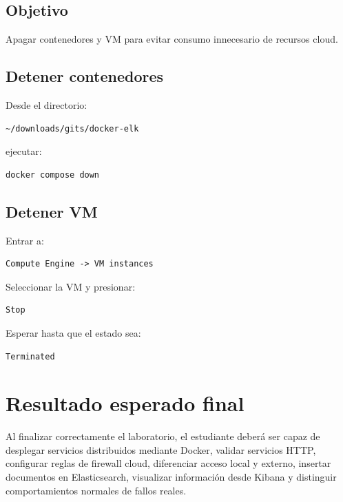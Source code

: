 \documentclass[
  coursetitle={Cómputo Nube y Tecnologías Emergentes},
  coursehours={96},
  coursedate={Verano 2026},
  doctype={Práctica},
  otherlangs={english,french},
  authorname={Lázaro},
  authorsurname={Bustio-Martínez},
  authortitle={PhD},
  role={Profesor Investigador},
  email={lbustio@inaoe.mx},
  phone={5559504000},
  ext={7459},
  institution={Instituto Nacional de Astrofísica, Óptica y Electrónica (INAOE)},
  department={Maestría en Ciencias en Tecnologías de Seguridad},
  address={Luis Enrique Erro 1, Sta. Ma. Tonantzintla, San Andrés Cholula, CP 72840, Puebla, México},
  margin={0.5in}
]{../../lbustio_lecture_notes}
\begin{document}
\subsection{Objetivo}

Apagar contenedores y VM para evitar consumo innecesario de recursos cloud.

\subsection{Detener contenedores}

Desde el directorio:

\begin{verbatim}
~/downloads/gits/docker-elk
\end{verbatim}

ejecutar:

\begin{lstlisting}
docker compose down
\end{lstlisting}

\subsection{Detener VM}

Entrar a:

\begin{verbatim}
Compute Engine -> VM instances
\end{verbatim}

Seleccionar la VM y presionar:

\begin{verbatim}
Stop
\end{verbatim}

Esperar hasta que el estado sea:

\begin{verbatim}
Terminated
\end{verbatim}

\section{Resultado esperado final}

Al finalizar correctamente el laboratorio, el estudiante deberá ser capaz de desplegar servicios distribuidos mediante Docker, validar servicios HTTP, configurar reglas de firewall cloud, diferenciar acceso local y externo, insertar documentos en Elasticsearch, visualizar información desde Kibana y distinguir comportamientos normales de fallos reales.
\end{document}
